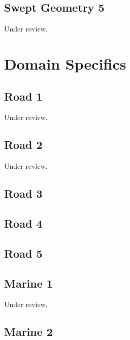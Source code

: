 \documentclass{scrartcl}
\begin{document}
\subsection{Swept Geometry 5} %
\label{sec:bridge_1}
Under review.%
\clearpage

\section{Domain Specifics}
\label{sec:domain_specifics}

\subsection{Road 1}  %
\label{sec:road_1}
Under review.%
\clearpage

\subsection{Road 2} %
\label{sec:road_2}
Under review.%
\clearpage

\subsection{Road 3} %
\label{sec:road_3}
\clearpage

\subsection{Road 4} %
\label{sec:road_4}
\clearpage

\subsection{Road 5} %
\label{sec:road_5}
\clearpage

\subsection{Marine 1} %
\label{sec:marine_1}
Under review.%
\clearpage

\subsection{Marine 2} %
\label{sec:marine_2}
\clearpage
\end{document}
